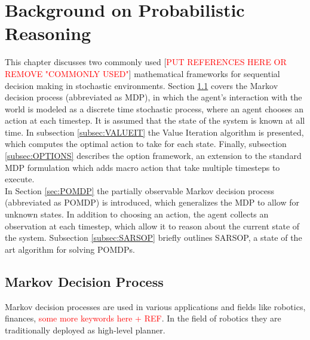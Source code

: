 \chapter{Background on Probabilistic Reasoning}
\label{chap:probabilistic}

This chapter discusses two commonly used [\textcolor{red}{PUT REFERENCES HERE OR REMOVE "COMMONLY USED"}] mathematical frameworks for sequential decision making in stochastic environments. Section \ref{sec:MDP} covers the Markov decision process (abbreviated as MDP), in which the agent's interaction with the world is modeled as a discrete time stochastic process, where an agent chooses an action at each timestep. It is assumed that the state of the system is known at all time. In subsection \ref{subsec:VALUEIT} the Value Iteration algorithm is presented, which computes the optimal action to take for each state. Finally, subsection \ref{subsec:OPTIONS} describes the option framework, an extension to the standard MDP formulation which adds macro action that take multiple timesteps to execute.\\
In Section \ref{sec:POMDP} the partially observable Markov decision process (abbreviated as POMDP) is introduced, which generalizes the MDP to allow for unknown states. In addition to choosing an action, the agent collects an observation at each timestep, which allow it to reason about the current state of the system. Subsection \ref{subsec:SARSOP} briefly outlines SARSOP, a state of the art algorithm for solving POMDPs.  
\section{Markov Decision Process}\label{sec:MDP}
Markov decision processes are used in various applications and fields like robotics, finances, \textcolor{red}{some more keywords here + REF}. In the field of robotics they are traditionally deployed as high-level planner. 
